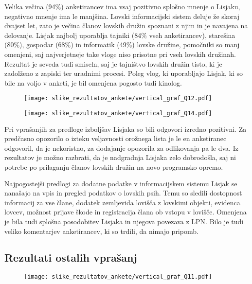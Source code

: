 \documentclass[a4paper,12pt,openright]{book}
\begin{document}
Velika večina (94\%) anketirancev ima vsaj pozitivno splošno mnenje o Lisjaku, negativno mnenje ima le manjšina.
Lovski informacijski sistem deluje že skoraj dvajset let, zato je večina članov lovskih družin spoznani z njim in je navajena na delovanje.
Lisjak najbolj uporablja tajniki (84\% vseh anketirancev), starešina (80\%), gospodar (68\%) in informatik (49\%) lovske družine, pomočniki so manj omenjeni, saj najverjetneje take vloge niso prisotne pri vseh lovskih družinah.
Rezultat je seveda tudi smiseln, saj je tajništvo lovskih družin tisto, ki je zadolženo z zapiski ter uradnimi procesi.
Poleg vlog, ki uporabljajo Lisjak, ki so bile na voljo v anketi, je bil omenjena pogosto tudi kinolog.


\begin{figure}[H]
    \centering
    \texttt{[image: slike\_rezultatov\_ankete/vertical\_graf\_Q12.pdf]}
\end{figure}

\begin{figure}[H]
    \centering
    \texttt{[image: slike\_rezultatov\_ankete/vertical\_graf\_Q14.pdf]}
\end{figure}


Pri vprašanjih za predloge izboljšav Lisjaka so bili odgovori izredno pozitivni. 
Za predčasno opozorilo o izteku veljavnosti orožnega lista je le en anketiranec odgovoril, da je nekoristno, za dodajanje opozorila za odlikovanja pa le dva.
Iz rezultatov je možno razbrati, da je nadgradnja Lisjaka zelo dobrodošla, saj ni potrebe po prilaganju članov lovskih družin na novo programsko opremo.

Najpogostejši predlogi za dodatne podatke v informacijskem sistemu Lisjak se nanašajo na vpis in pregled podatkov o lovskih psih.
Temu so sledili dostopnost informacij za vse člane, dodatek zemljevida lovišča z lovskimi objekti, evidenca lovcev, možnost prijave škode in registracija člana ob vstopu v lovišče.
Omenjena je bila tudi splošna posodobitev Lisjaka in njegova povezava z LPN.
Bilo je tudi veliko komentarjev anketirancev, ki so trdili, da nimajo pripomb.

\subsection{Rezultati ostalih vprašanj}

\begin{figure}[H]
    \centering
    \texttt{[image: slike\_rezultatov\_ankete/vertical\_graf\_Q11.pdf]}
\end{figure}
\end{document}
